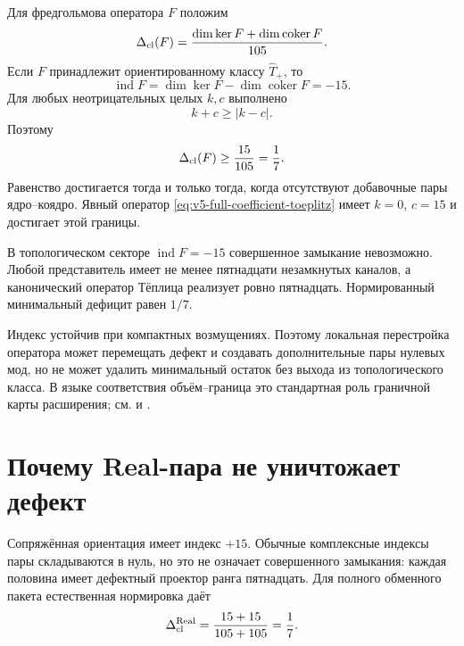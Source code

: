 Для фредгольмова оператора $F$ положим
\begin{equation}
 \Delta_{\rm cl}(F)
 =\frac{\dim\ker F+\dim\operatorname{coker}F}{105}.
 \label{eq:v5-closure-deficit-definition}
\end{equation}
Если $F$ принадлежит ориентированному классу $\widehat T_+$, то
\begin{equation}
 \operatorname{ind}F
 =\dim\ker F-\dim\operatorname{coker}F=-15.
\end{equation}
Для любых неотрицательных целых $k,c$ выполнено
\begin{equation}
 k+c\geq |k-c|.
\end{equation}
Поэтому
\begin{equation}
 \Delta_{\rm cl}(F)\geq\frac{15}{105}=\frac17.
 \label{eq:v5-closure-deficit-bound}
\end{equation}
Равенство достигается тогда и только тогда, когда отсутствуют добавочные
пары ядро--коядро. Явный оператор \eqref{eq:v5-full-coefficient-toeplitz}
имеет $k=0$, $c=15$ и достигает этой границы.

\begin{theorem}
В топологическом секторе $\operatorname{ind}F=-15$ совершенное замыкание
невозможно. Любой представитель имеет не менее пятнадцати незамкнутых
каналов, а канонический оператор Тёплица реализует ровно пятнадцать.
Нормированный минимальный дефицит равен $1/7$.
\end{theorem}

Индекс устойчив при компактных возмущениях. Поэтому локальная перестройка
оператора может перемещать дефект и создавать дополнительные пары
нулевых мод, но не может удалить минимальный остаток без выхода из
топологического класса. В языке соответствия объём--граница это стандартная
роль граничной карты расширения; см.  и
.

\section{Почему Real-пара не уничтожает дефект}

Сопряжённая ориентация имеет индекс $+15$. Обычные комплексные индексы
пары складываются в нуль, но это не означает совершенного замыкания:
каждая половина имеет дефектный проектор ранга пятнадцать. Для полного
обменного пакета естественная нормировка даёт
\begin{equation}
 \Delta_{\rm cl}^{\rm Real}
 =\frac{15+15}{105+105}=\frac17.
 \label{eq:v5-real-pair-closure-deficit}
\end{equation}

